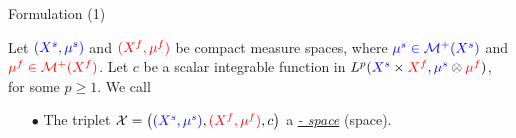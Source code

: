 \documentclass{beamer}
\newcommand{\cX}{\mathcal X}
\newcommand{\cM}{\mathcal M}
\newcommand{\sfspace}{{\color{blue}{s.}}{\color{red}{f. }}}
\begin{document}
\begin{frame}{Formulation (1)}
\scriptsize
  \begin{definition}
    Let ${\color{blue}{(X^s, \mu^s)}}$ and ${\color{red}{(X^f, \mu^f)}}$ be compact measure spaces, where ${\color{blue}{\mu^s \in \cM^+(X^s)}}$ and ${\color{red}{\mu^f \in \cM^+(X^f)}}$. Let $c$ be a scalar integrable function in $L^p({\color{blue}{X^s}} \times {\color{red}{X^f}}, {\color{blue}{\mu^s}} \otimes {\color{red}{\mu^f}})$, for some $p \geq 1$. We call
    \begin{itemize}
      \setlength\itemindent{10pt}
      \item[$\bullet$] The triplet
      $\cX = \left({\color{blue}{(X^s, \mu^s)}}, {\color{red}{(X^f, \mu^f)}}, c \right)$
      a \underline{\textit{{\color{blue}{sample}} - {\color{red}{feature}} space}}
      (\sfspace space).


\end{itemize}
\end{definition}
\end{frame}
\end{document}
